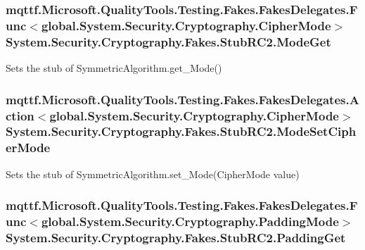 \hypertarget{class_system_1_1_security_1_1_cryptography_1_1_fakes_1_1_stub_r_c2_ae8aedea3347e49bbedb49d553a331cf5}{
\subsubsection[{Mode\-Get}]{\setlength{\rightskip}{0pt plus 5cm}mqttf.\-Microsoft.\-Quality\-Tools.\-Testing.\-Fakes.\-Fakes\-Delegates.\-Func$<$global.\-System.\-Security.\-Cryptography.\-Cipher\-Mode$>$ System.\-Security.\-Cryptography.\-Fakes.\-Stub\-R\-C2.\-Mode\-Get}}\label{class_system_1_1_security_1_1_cryptography_1_1_fakes_1_1_stub_r_c2_ae8aedea3347e49bbedb49d553a331cf5}


Sets the stub of Symmetric\-Algorithm.\-get\-\_\-\-Mode()

\hypertarget{class_system_1_1_security_1_1_cryptography_1_1_fakes_1_1_stub_r_c2_a43b196ac0eda524ec39e26b904a9ccfe}{
\subsubsection[{Mode\-Set\-Cipher\-Mode}]{\setlength{\rightskip}{0pt plus 5cm}mqttf.\-Microsoft.\-Quality\-Tools.\-Testing.\-Fakes.\-Fakes\-Delegates.\-Action$<$global.\-System.\-Security.\-Cryptography.\-Cipher\-Mode$>$ System.\-Security.\-Cryptography.\-Fakes.\-Stub\-R\-C2.\-Mode\-Set\-Cipher\-Mode}}\label{class_system_1_1_security_1_1_cryptography_1_1_fakes_1_1_stub_r_c2_a43b196ac0eda524ec39e26b904a9ccfe}


Sets the stub of Symmetric\-Algorithm.\-set\-\_\-\-Mode(\-Cipher\-Mode value)

\hypertarget{class_system_1_1_security_1_1_cryptography_1_1_fakes_1_1_stub_r_c2_a97e5133230ffc8b64d20218ed7af6fc2}{
\subsubsection[{Padding\-Get}]{\setlength{\rightskip}{0pt plus 5cm}mqttf.\-Microsoft.\-Quality\-Tools.\-Testing.\-Fakes.\-Fakes\-Delegates.\-Func$<$global.\-System.\-Security.\-Cryptography.\-Padding\-Mode$>$ System.\-Security.\-Cryptography.\-Fakes.\-Stub\-R\-C2.\-Padding\-Get}}\label{class_system_1_1_security_1_1_cryptography_1_1_fakes_1_1_stub_r_c2_a97e5133230ffc8b64d20218ed7af6fc2}


